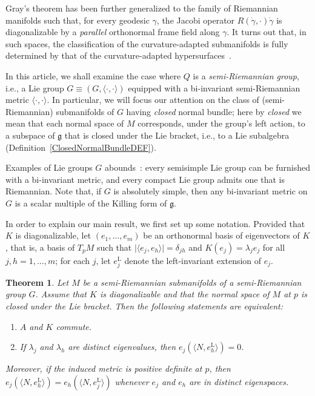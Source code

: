 \documentclass[a4paper,12pt,oneside]{amsart}
\theoremstyle{plain}
\newtheorem{theorem}{Theorem}[section]
\theoremstyle{remark}
\theoremstyle{definition}
\begin{document}
Gray's theorem has been further generalized to the family of Riemannian manifolds such that, for every geodesic $\gamma$, the Jacobi operator $R(\dot{\gamma},\cdot)\dot{\gamma}$ is diagonalizable by a \emph{parallel} orthonormal frame field along $\gamma$. It turns out that, in such spaces, the classification of the curvature-adapted submanifolds is fully determined by that of the curvature-adapted hypersurfaces~\cite{berndt1992, berndt1992-2}.

In this article, we shall examine the case where $Q$ is a \textit{semi-Riemannian group}, i.e., a Lie group $G \equiv (G, \langle \cdot{,} \cdot \rangle)$ equipped with a bi-invariant semi-Riemannian metric $\langle \cdot{,} \cdot \rangle$. In particular, we will focus our attention on the class of (semi-Riemannian) submanifolds of $G$ having \emph{closed} normal bundle; here by \emph{closed} we mean that each normal space of $M$ corresponds, under the group's left action, to a subspace of $\mathfrak{g}$ that is closed under the Lie bracket, i.e., to a Lie subalgebra (Definition~\ref{ClosedNormalBundleDEF}).

Examples of Lie groups $G$ abounds~\cite{ovando2016}: every semisimple Lie group can be furnished with a bi-invariant metric, and every compact Lie group admits one that is Riemannian. Note that, if $G$ is absolutely simple, then any bi-invariant metric on $G$ is a scalar multiple of the Killing form of $\mathfrak{g}$. 

In order to explain our main result, we first set up some notation. Provided that $K$ is diagonalizable, let $(e_{1}, \dotsc, e_{m})$ be an orthonormal basis of eigenvectors of $K$, that is, a basis of $T_{p}M$ such that $\lvert \langle e_{j}, e_{h} \rangle\rvert =\delta_{jh}$ and $K(e_{j}) = \lambda_{j} e_{j}$ for all $j,h = 1,\dotsc,m$; for each $j$, let $e_{j}^{\mathrm{L}}$ denote the left-invariant extension of $e_{j}$.

\begin{theorem} \label{TH1}
Let $M$ be a semi-Riemannian submanifolds of a semi-Riemannian group $G$. Assume that $K$ is diagonalizable and that the normal space of $M$ at $p$ is closed under the Lie bracket. Then the following statements are equivalent:
\begin{enumerate}[font=\upshape, label=(\roman*)]
\item $A$ and $K$ commute.
\item \label{item2} If $\lambda_{j}$ and $\lambda_{h}$ are distinct eigenvalues, then $e_{j}(\langle N, e_{h}^{\mathrm{L}} \rangle) = 0$.
\end{enumerate}
Moreover, if the induced metric is positive definite at $p$, then $e_{j}(\langle N, e_{h}^{\mathrm{L}} \rangle) = e_{h}(\langle N, e_{j}^{\mathrm{L}} \rangle)$ whenever $e_{j}$ and $e_{h}$ are in distinct eigenspaces.
\end{theorem}
\end{document}
